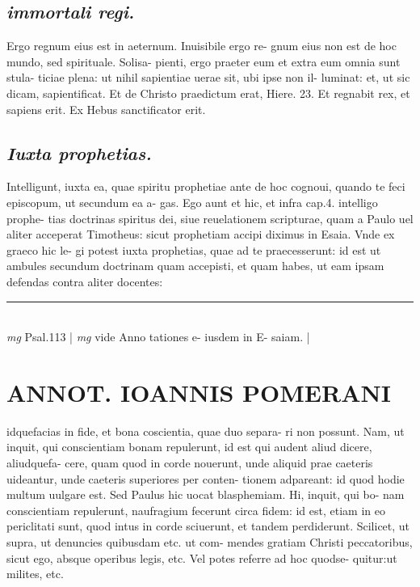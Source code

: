 \documentclass{article}
\begin{document}
\begin{pages}
\subsection*{\textit{immortali regi. }}\pstart Ergo regnum eius est in aeternum. Inuisibile ergo re- gnum eius non est de hoc mundo, sed spirituale. Solisa- pienti, ergo praeter eum et extra eum omnia sunt stula- ticiae plena: ut nihil sapientiae uerae sit, ubi ipse non il- luminat: et, ut sic dicam, sapientificat. Et de Christo praedictum erat, Hiere. 23. Et regnabit rex, et sapiens erit. Ex Hebus  sanctificator erit.  \pend
{}
{}
\subsection*{\textit{Iuxta prophetias. }}\pstart Intelligunt, iuxta ea, quae spiritu prophetiae ante de hoc cognoui, quando te feci episcopum, ut secundum ea a- gas. Ego aunt et hic, et infra cap.4. intelligo prophe- tias doctrinas spiritus dei, siue reuelationem scripturae, quam a Paulo uel aliter acceperat Timotheus: sicut prophetiam accipi diximus in Esaia. Vnde ex graeco hic le- gi potest iuxta prophetias, quae ad te praecesserunt: id est ut ambules secundum doctrinam quam accepisti, et quam habes, ut eam ipsam defendas contra aliter docentes:  \pend
\vspace{0.5cm}\noindent
\vspace{0.2cm}\rule{1cm}{0.2pt}\\ 
\hspace{0.2cm}\textit{mg}
\footnotesize Psal.113 
\normalsize| 
\hspace{0.2cm}\textit{mg}
\footnotesize vide Anno tationes e- iusdem in E- saiam. 
\normalsize| 
\section*{ANNOT. IOANNIS POMERANI }\pstart idquefacias in fide, et bona coscientia, quae duo separa- ri non possunt. Nam, ut inquit, qui conscientiam bonam repulerunt, id est qui audent aliud dicere, aliudquefa- cere, quam quod in corde nouerunt, unde aliquid prae caeteris uideantur, unde caeteris superiores per conten- tionem adpareant: id quod hodie multum uulgare est. Sed Paulus hic uocat blasphemiam. Hi, inquit, qui bo- nam conscientiam repulerunt, naufragium fecerunt circa fidem: id est, etiam in eo periclitati sunt, quod intus in corde sciuerunt, et tandem perdiderunt.  \pend\pstart Scilicet, ut supra, ut denuncies quibusdam etc. ut com- mendes gratiam Christi peccatoribus, sicut ego, absque  operibus legis, etc. Vel potes referre ad hoc quodse- quitur:ut milites, etc.  \pend
{}
{}

\end{pages}
\end{document}
